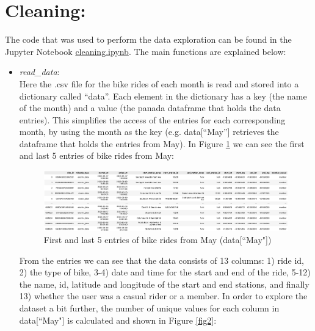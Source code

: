 \documentclass[12pt]{article}
\begin{document}
\section*{Cleaning:}
The code that was used to perform the data exploration can be found in the Jupyter Notebook \href{https://github.com/SummerKassem/BikeShareCS/blob/main/Code/cleaning.ipynb}{cleaning.ipynb}. The main functions are explained below:
\begin{itemize}
	\item \textit{read\_data}:\\
	Here the .csv file for the bike rides of each month is read and stored into a dictionary called “data”. Each element in the dictionary has a key (the name of the month) and a value (the panada dataframe that holds the data entries). This simplifies the access of the entries for each corresponding month, by using the month as the key (e.g. data[“May”] retrieves the dataframe that holds the entries from May). In Figure \ref{fig1} we can see the first and last 5 entries of bike rides from May:

	\begin{figure}[h]
	\hspace{-1.8cm}
	\includegraphics[width=8 in, height = 2 in]{imgMay.png}
	\caption{First and last 5 entries of bike rides from May (data[``May"])}
	\label{fig1}
	\end{figure}
	\pagebreak
	
	From the entries we can see that the data consists of 13 columns: 1) ride id, 2) the type of bike, 3-4) date and time for the start and end of the ride, 5-12) the name, id, latitude and longitude of the start and end stations, and finally 13) whether the user was a casual rider or a member. In order to explore the dataset a bit further, the number of unique values for each column in data[``May"] is calculated and shown in Figure \ref{fig2}:
	

\end{itemize}
\end{document}
